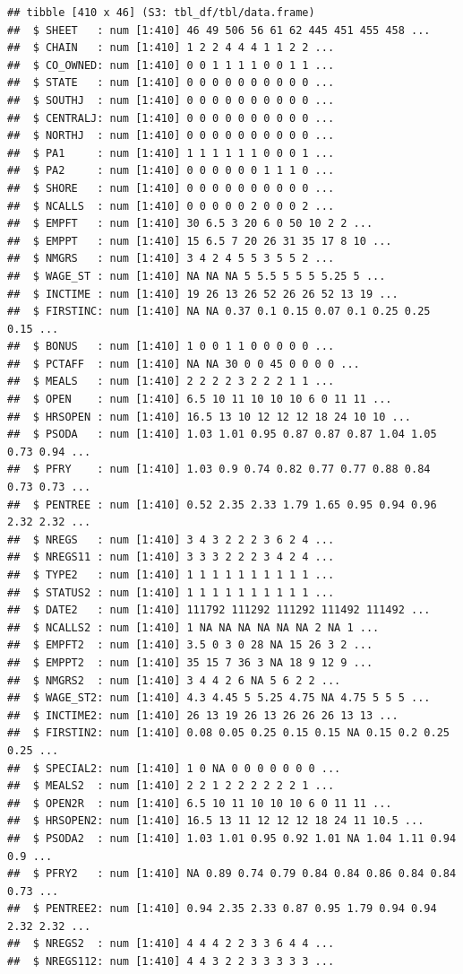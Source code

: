 \documentclass[
]{article}
\begin{document}
\begin{verbatim}
## tibble [410 x 46] (S3: tbl_df/tbl/data.frame)
##  $ SHEET   : num [1:410] 46 49 506 56 61 62 445 451 455 458 ...
##  $ CHAIN   : num [1:410] 1 2 2 4 4 4 1 1 2 2 ...
##  $ CO_OWNED: num [1:410] 0 0 1 1 1 1 0 0 1 1 ...
##  $ STATE   : num [1:410] 0 0 0 0 0 0 0 0 0 0 ...
##  $ SOUTHJ  : num [1:410] 0 0 0 0 0 0 0 0 0 0 ...
##  $ CENTRALJ: num [1:410] 0 0 0 0 0 0 0 0 0 0 ...
##  $ NORTHJ  : num [1:410] 0 0 0 0 0 0 0 0 0 0 ...
##  $ PA1     : num [1:410] 1 1 1 1 1 1 0 0 0 1 ...
##  $ PA2     : num [1:410] 0 0 0 0 0 0 1 1 1 0 ...
##  $ SHORE   : num [1:410] 0 0 0 0 0 0 0 0 0 0 ...
##  $ NCALLS  : num [1:410] 0 0 0 0 0 2 0 0 0 2 ...
##  $ EMPFT   : num [1:410] 30 6.5 3 20 6 0 50 10 2 2 ...
##  $ EMPPT   : num [1:410] 15 6.5 7 20 26 31 35 17 8 10 ...
##  $ NMGRS   : num [1:410] 3 4 2 4 5 5 3 5 5 2 ...
##  $ WAGE_ST : num [1:410] NA NA NA 5 5.5 5 5 5 5.25 5 ...
##  $ INCTIME : num [1:410] 19 26 13 26 52 26 26 52 13 19 ...
##  $ FIRSTINC: num [1:410] NA NA 0.37 0.1 0.15 0.07 0.1 0.25 0.25 0.15 ...
##  $ BONUS   : num [1:410] 1 0 0 1 1 0 0 0 0 0 ...
##  $ PCTAFF  : num [1:410] NA NA 30 0 0 45 0 0 0 0 ...
##  $ MEALS   : num [1:410] 2 2 2 2 3 2 2 2 1 1 ...
##  $ OPEN    : num [1:410] 6.5 10 11 10 10 10 6 0 11 11 ...
##  $ HRSOPEN : num [1:410] 16.5 13 10 12 12 12 18 24 10 10 ...
##  $ PSODA   : num [1:410] 1.03 1.01 0.95 0.87 0.87 0.87 1.04 1.05 0.73 0.94 ...
##  $ PFRY    : num [1:410] 1.03 0.9 0.74 0.82 0.77 0.77 0.88 0.84 0.73 0.73 ...
##  $ PENTREE : num [1:410] 0.52 2.35 2.33 1.79 1.65 0.95 0.94 0.96 2.32 2.32 ...
##  $ NREGS   : num [1:410] 3 4 3 2 2 2 3 6 2 4 ...
##  $ NREGS11 : num [1:410] 3 3 3 2 2 2 3 4 2 4 ...
##  $ TYPE2   : num [1:410] 1 1 1 1 1 1 1 1 1 1 ...
##  $ STATUS2 : num [1:410] 1 1 1 1 1 1 1 1 1 1 ...
##  $ DATE2   : num [1:410] 111792 111292 111292 111492 111492 ...
##  $ NCALLS2 : num [1:410] 1 NA NA NA NA NA NA 2 NA 1 ...
##  $ EMPFT2  : num [1:410] 3.5 0 3 0 28 NA 15 26 3 2 ...
##  $ EMPPT2  : num [1:410] 35 15 7 36 3 NA 18 9 12 9 ...
##  $ NMGRS2  : num [1:410] 3 4 4 2 6 NA 5 6 2 2 ...
##  $ WAGE_ST2: num [1:410] 4.3 4.45 5 5.25 4.75 NA 4.75 5 5 5 ...
##  $ INCTIME2: num [1:410] 26 13 19 26 13 26 26 26 13 13 ...
##  $ FIRSTIN2: num [1:410] 0.08 0.05 0.25 0.15 0.15 NA 0.15 0.2 0.25 0.25 ...
##  $ SPECIAL2: num [1:410] 1 0 NA 0 0 0 0 0 0 0 ...
##  $ MEALS2  : num [1:410] 2 2 1 2 2 2 2 2 2 1 ...
##  $ OPEN2R  : num [1:410] 6.5 10 11 10 10 10 6 0 11 11 ...
##  $ HRSOPEN2: num [1:410] 16.5 13 11 12 12 12 18 24 11 10.5 ...
##  $ PSODA2  : num [1:410] 1.03 1.01 0.95 0.92 1.01 NA 1.04 1.11 0.94 0.9 ...
##  $ PFRY2   : num [1:410] NA 0.89 0.74 0.79 0.84 0.84 0.86 0.84 0.84 0.73 ...
##  $ PENTREE2: num [1:410] 0.94 2.35 2.33 0.87 0.95 1.79 0.94 0.94 2.32 2.32 ...
##  $ NREGS2  : num [1:410] 4 4 4 2 2 3 3 6 4 4 ...
##  $ NREGS112: num [1:410] 4 4 3 2 2 3 3 3 3 3 ...
\end{verbatim}
\end{document}
